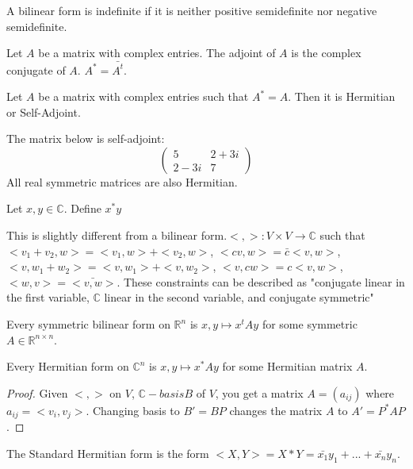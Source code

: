 \documentclass{article}
\newcommand{\C}{\mathbb{C}}
\newcommand{\R}{\mathbb{R}}
\newcommand{\ra}[1][]{\xrightarrow{#1}}
\begin{document}
\begin{definition}
A bilinear form is indefinite if it is neither positive semidefinite nor negative semidefinite.
\end{definition}
\begin{definition}
Let $A$ be a matrix with complex entries. The adjoint of $A$ is the complex conjugate of $A$. $A^*=\bar{A^t}$. 
\end{definition}
\begin{definition}
Let $A$ be a matrix with complex entries such that $A^*=A$. Then it is Hermitian or Self-Adjoint.
\end{definition}
\begin{example}
The matrix below is self-adjoint:
$$\begin{pmatrix}
5&2+3i\\2-3i&7
\end{pmatrix}$$
All real symmetric matrices are also Hermitian.
\end{example}
Let $x,y\in \C$. Define $x^*y$
\begin{definition}
This is slightly different from a bilinear form.$<,>:V\times V\ra \C$ such that $<v_1+v_2,w>=<v_1,w>+<v_2,w>$, $<cv,w>=\bar{c}<v,w>$, $<v,w_1+w_2>=<v,w_1>+<v,w_2>$, $<v,cw>=c<v,w>$, $<w,v>=\bar{<v,w>}$. These constraints can be described as "conjugate linear in the first variable, $\C$ linear in the second variable, and conjugate symmetric"
\end{definition}
\begin{definition}
Every symmetric bilinear form on $\R^n$ is $x,y\mapsto x^tAy$ for some symmetric $A\in \R^{n\times n}$.
\end{definition}
\begin{proposition}
Every Hermitian form on $\C^n$ is $x,y\mapsto x^*Ay$ for some Hermitian matrix $A$. 
\end{proposition}
\begin{proof}
Given $<,>$ on $V$, $\C-basis B$ of $V$, you get a matrix $A=(a_{ij})$ where $a_{ij}=<v_i,v_j>$. Changing basis to $B'=BP$ changes the matrix $A$ to $A'=P^*AP$.
\end{proof}
\begin{definition}
The Standard Hermitian form is the form $<X,Y>=X*Y=\bar{x_1}y_1+...+\bar{x_n}y_n$.
\end{definition}
\end{document}

